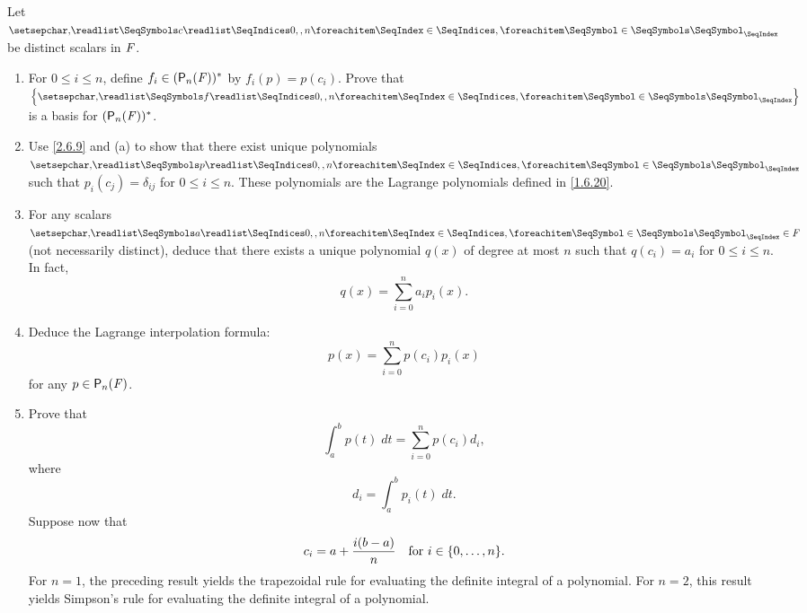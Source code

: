 \begin{ex}\label{ex:2.6.10}
	Let \(\seq{c}{0,,n}\) be distinct scalars in \(\mathit{F}\).
	\begin{enumerate}
		\item For \(0 \leq i \leq n\), define \(f_i \in (\ps[n]{\F})^*\) by \(f_i(p) = p(c_i)\).
		      Prove that \(\set{\seq{f}{0,,n}}\) is a basis for \((\ps[n]{\F})^*\).
		\item Use \cref{2.6.9} and (a) to show that there exist unique polynomials \(\seq{p}{0,,n}\) such that \(p_i(c_j) = \delta_{i j}\) for \(0 \leq i \leq n\).
		      These polynomials are the Lagrange polynomials defined in \cref{1.6.20}.
		\item For any scalars \(\seq{a}{0,,n} \in \F\) (not necessarily distinct), deduce that there exists a unique polynomial \(q(x)\) of degree at most \(n\) such that \(q(c_i) = a_i\) for \(0 \leq i \leq n\).
		      In fact,
		      \[
			      q(x) = \sum_{i = 0}^n a_i p_i(x).
		      \]
		\item Deduce the Lagrange interpolation formula:
		      \[
			      p(x) = \sum_{i = 0}^n p(c_i) p_i(x)
		      \]
		      for any \(p \in \ps[n]{\F}\).
		\item Prove that
		      \[
			      \int_a^b p(t) \; dt = \sum_{i = 0}^n p(c_i) d_i,
		      \]
		      where
		      \[
			      d_i = \int_a^b p_i(t) \; dt.
		      \]
		      Suppose now that
		      \[
			      c_i = a + \frac{i (b - a)}{n} \quad \text{for } i \in \set{0, \dots, n}.
		      \]
		      For \(n = 1\), the preceding result yields the trapezoidal rule for evaluating the definite integral of a polynomial.
		      For \(n = 2\), this result yields Simpson's rule for evaluating the definite integral of a polynomial.
	\end{enumerate}
\end{ex}

